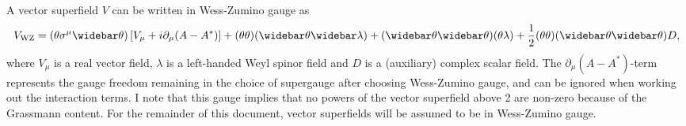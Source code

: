 \documentclass[english, notitlepage]{article}
\begin{document}
    A vector superfield $V$ can be written in Wess-Zumino gauge as
    \begin{align}
        \msub{V}{WZ} = (\theta\sigma^\mu\wbar\theta) \bclosed{V_\mu + i\partial_\mu (A - A^*)} + (\theta\theta) (\wbar\theta\wbar\lambda) +
        (\wbar\theta\wbar\theta)(\theta\lambda) + \frac{1}{2}
        (\theta\theta)(\wbar\theta\wbar\theta) D,
    \end{align}
    where $V_\mu$ is a real vector field, $\lambda$ is a left-handed Weyl spinor field and $D$ is a (auxiliary) complex scalar field.
    The $\partial_\mu (A-A^*)$-term represents the gauge freedom remaining in the choice of
    supergauge after choosing Wess-Zumino gauge, and can be ignored when working
    out the interaction terms.
    I note that this gauge implies that no powers of the vector superfield above 2 are non-zero because of the Grassmann content.
    For the remainder of this document, vector superfields will be assumed to be in Wess-Zumino gauge.
\end{document}
